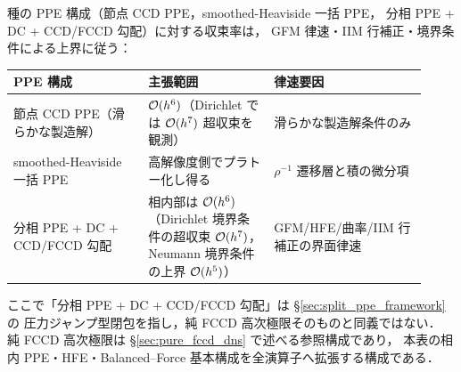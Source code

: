  種の PPE 構成（節点 CCD PPE，smoothed-Heaviside 一括 PPE，
分相 PPE + DC + CCD/FCCD 勾配）に対する収束率は，
GFM 律速・IIM 行補正・境界条件による上界に従う：
\begin{center}
\small
\renewcommand{\arraystretch}{\PaperTableArrayStretch}
\begin{tabular}{@{}p{0.30\linewidth}p{0.28\linewidth}p{0.34\linewidth}@{}}
\hline
PPE 構成 & 主張範囲 & 律速要因 \\
\hline
節点 CCD PPE（滑らかな製造解） & $\mathcal{O}(h^6)$（Dirichlet では $\mathcal{O}(h^7)$ 超収束を観測） & 滑らかな製造解条件のみ \\
smoothed-Heaviside 一括 PPE & 高解像度側でプラトー化し得る & $\rho^{-1}$ 遷移層と積の微分項 \\
分相 PPE + DC + CCD/FCCD 勾配 & 相内部は $\mathcal{O}(h^6)$（Dirichlet 境界条件の超収束 $\mathcal{O}(h^7)$，Neumann 境界条件の上界 $\mathcal{O}(h^5)$） & GFM/HFE/曲率/IIM 行補正の界面律速 \\
\hline
\end{tabular}
\end{center}
ここで「分相 PPE + DC + CCD/FCCD 勾配」は §\ref{sec:split_ppe_framework} の
圧力ジャンプ型閉包を指し，純 FCCD 高次極限そのものと同義ではない．
純 FCCD 高次極限は §\ref{sec:pure_fccd_dns} で述べる参照構成であり，
本表の相内 PPE・HFE・Balanced--Force 基本構成を全演算子へ拡張する構成である．
